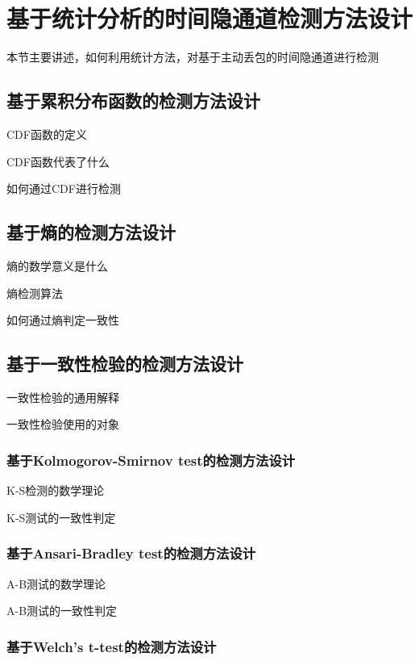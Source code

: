 \section{基于统计分析的时间隐通道检测方法设计}
\label{chap:analyze:statistical}

本节主要讲述，如何利用统计方法，对基于主动丢包的时间隐通道进行检测

\subsection{基于累积分布函数的检测方法设计}
\label{chap:analyze:statistical:cdf}

CDF函数的定义

CDF函数代表了什么

如何通过CDF进行检测

\subsection{基于熵的检测方法设计}
\label{chap:analyze:statistical:entropy}

熵的数学意义是什么

熵检测算法

如何通过熵判定一致性

\subsection{基于一致性检验的检测方法设计}
\label{chap:analyze:statistical:test}

一致性检验的通用解释

一致性检验使用的对象

\subsubsection{基于Kolmogorov-Smirnov test的检测方法设计}
\label{chap:analyze:statistical:test:ks}

K-S检测的数学理论

K-S测试的一致性判定

\subsubsection{基于Ansari-Bradley test的检测方法设计}
\label{chap:analyze:statistical:test:an}

A-B测试的数学理论

A-B测试的一致性判定

\subsubsection{基于Welch’s t-test的检测方法设计}
\label{chap:analyze:statistical:test:t}

